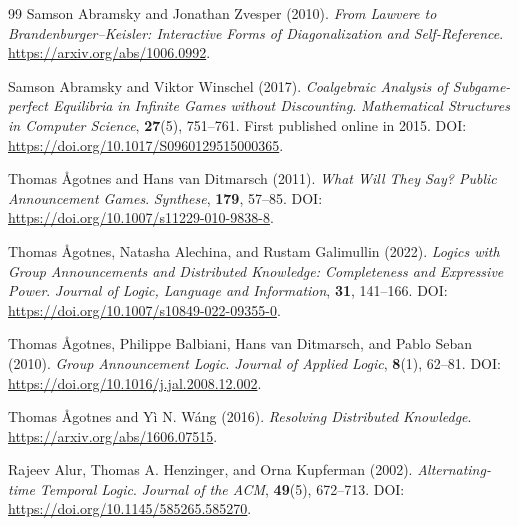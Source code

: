 \documentclass[11pt,a4paper]{article}
\numberwithin{equation}{section}
\theoremstyle{definition}
\theoremstyle{remark}
\theoremstyle{plain}
\begin{document}
\begin{thebibliography}{99}
\setlength{\itemsep}{5pt}
Samson Abramsky and Jonathan Zvesper (2010).
\newblock \emph{From Lawvere to Brandenburger--Keisler: Interactive Forms of Diagonalization and Self-Reference}.
\newblock \url{https://arxiv.org/abs/1006.0992}.

Samson Abramsky and Viktor Winschel (2017).
\newblock \emph{Coalgebraic Analysis of Subgame-perfect Equilibria in Infinite Games without Discounting}.
\newblock \emph{Mathematical Structures in Computer Science}, \textbf{27}(5), 751--761. First published online in 2015.
\newblock DOI: \url{https://doi.org/10.1017/S0960129515000365}.

Thomas Ågotnes and Hans van Ditmarsch (2011).
\newblock \emph{What Will They Say? Public Announcement Games}.
\newblock \emph{Synthese}, \textbf{179}, 57--85.
\newblock DOI: \url{https://doi.org/10.1007/s11229-010-9838-8}.

Thomas Ågotnes, Natasha Alechina, and Rustam Galimullin (2022).
\newblock \emph{Logics with Group Announcements and Distributed Knowledge: Completeness and Expressive Power}.
\newblock \emph{Journal of Logic, Language and Information}, \textbf{31}, 141--166.
\newblock DOI: \url{https://doi.org/10.1007/s10849-022-09355-0}.

Thomas Ågotnes, Philippe Balbiani, Hans van Ditmarsch, and Pablo Seban (2010).
\newblock \emph{Group Announcement Logic}.
\newblock \emph{Journal of Applied Logic}, \textbf{8}(1), 62--81.
\newblock DOI: \url{https://doi.org/10.1016/j.jal.2008.12.002}.

Thomas Ågotnes and Yì N. Wáng (2016).
\newblock \emph{Resolving Distributed Knowledge}.
\newblock \url{https://arxiv.org/abs/1606.07515}.

Rajeev Alur, Thomas A. Henzinger, and Orna Kupferman (2002).
\newblock \emph{Alternating-time Temporal Logic}.
\newblock \emph{Journal of the ACM}, \textbf{49}(5), 672--713.
\newblock DOI: \url{https://doi.org/10.1145/585265.585270}.


\end{thebibliography}
\end{document}
